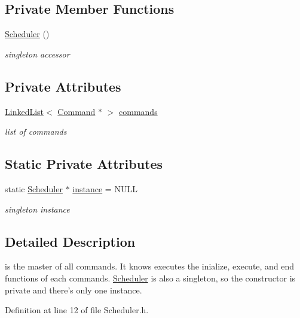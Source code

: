 \subsection*{Private Member Functions}
\begin{DoxyCompactItemize}
\item 
\hyperlink{classScheduler_a3b61aac11466cd45ae42ab8c2b0013f6}{Scheduler} ()
\begin{DoxyCompactList}\small\item\em singleton accessor \end{DoxyCompactList}\end{DoxyCompactItemize}
\subsection*{Private Attributes}
\begin{DoxyCompactItemize}
\item 
\hyperlink{classLinkedList}{Linked\-List}$<$ \hyperlink{classCommand}{Command} $\ast$ $>$ \hyperlink{classScheduler_ad320e81fdf3a591b1f1d638f8fa5065d}{commands}
\begin{DoxyCompactList}\small\item\em list of commands \end{DoxyCompactList}\end{DoxyCompactItemize}
\subsection*{Static Private Attributes}
\begin{DoxyCompactItemize}
\item 
static \hyperlink{classScheduler}{Scheduler} $\ast$ \hyperlink{classScheduler_ae683641d0a2c37275631cebb77387e2f}{instance} = N\-U\-L\-L
\begin{DoxyCompactList}\small\item\em singleton instance \end{DoxyCompactList}\end{DoxyCompactItemize}


\subsection{Detailed Description}
is the master of all commands. It knows executes the inialize, execute, and end functions of each commands. \hyperlink{classScheduler}{Scheduler} is also a singleton, so the constructor is private and there's only one instance. 

Definition at line 12 of file Scheduler.\-h.



